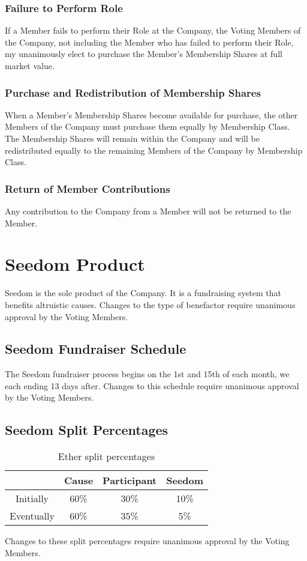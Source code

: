 \documentclass[11pt]{article}
\begin{document}
\subsubsection{Failure to Perform Role}
If a Member fails to perform their Role at the Company, the Voting Members of the Company, not including the Member who has failed to perform their Role, my unanimously elect to purchase the Member's Membership Shares at full market value.

\subsubsection{Purchase and Redistribution of Membership Shares}
When a Member's Membership Shares become available for purchase, the other Members of the Company must purchase them equally by Membership Class. The Membership Shares will remain within the Company and will be redistributed equally to the remaining Members of the Company by Membership Class.

\subsubsection{Return of Member Contributions}
Any contribution to the Company from a Member will not be returned to the Member.

\section{Seedom Product}
Seedom is the sole product of the Company. It is a fundraising system that benefits altruistic causes. Changes to the type of benefactor require unanimous approval by the Voting Members.

\subsection{Seedom Fundraiser Schedule}
\label{sec:seedomFundraiserSchedule}
The Seedom fundraiser process begins on the 1st and 15th of each month, we each ending 13 days after. Changes to this schedule require unanimous approval by the Voting Members.

\subsection{Seedom Split Percentages}
\begin{table}[H]
\begin{center}
\begin{tabular}{| c | c | c | c |}
\hline
& \textbf{Cause} & \textbf{Participant} & \textbf{Seedom} \\ \hline
Initially & 60\% & 30\% & 10\% \\ \hline
Eventually & 60\% & 35\% & 5\% \\ \hline
\end{tabular}
\caption{Ether split percentages}
\label{tab:etherSplitPercentages}
\end{center}
\end{table}
Changes to these split percentages require unanimous approval by the Voting Members.
\end{document}
